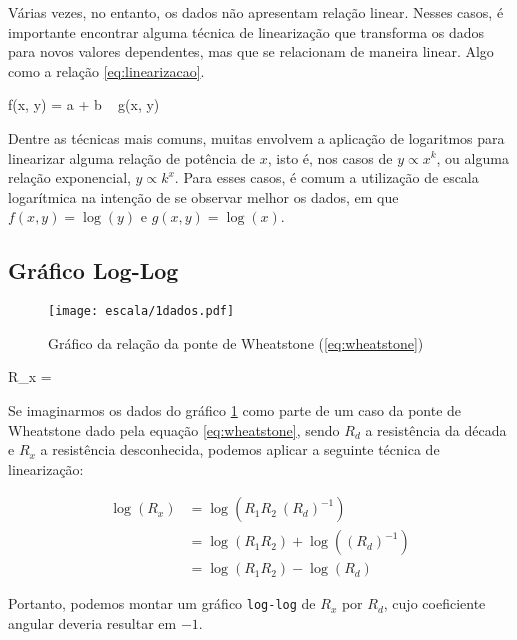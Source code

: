 Várias vezes, no entanto, os dados não apresentam relação linear. Nesses casos, é importante encontrar alguma técnica de linearização que transforma os dados para novos valores dependentes, mas que se relacionam de maneira linear. Algo como a relação \ref{eq:linearizacao}.

\begin{equacao} \label{eq:linearizacao}
    f(x, y) = a + b ~ g(x, y)
\end{equacao}

Dentre as técnicas mais comuns, muitas envolvem a aplicação de logaritmos para linearizar alguma relação de potência de $x$, isto é, nos casos de $y \propto x^k$, ou alguma relação exponencial, $y \propto k^x$. Para esses casos, é comum a utilização de escala logarítmica na intenção de se observar melhor os dados, em que $f(x, y) = \log(y)$ e $g(x, y) = \log(x)$.


\subsection{Gráfico Log-Log} \label{sec:escala:loglog}

    \begin{figure}[htbp]
        \centering
        \texttt{[image: escala/1dados.pdf]}

        \caption{Gráfico da relação da ponte de Wheatstone (\ref{eq:wheatstone})}
        \label{fig:escala:loglog:dados}
    \end{figure}

    \begin{equacao} \label{eq:wheatstone}
        R_x = 
    \end{equacao}

    Se imaginarmos os dados do gráfico \ref{fig:escala:loglog:dados} como parte de um caso da ponte de Wheatstone dado pela equação \ref{eq:wheatstone}, sendo $R_d$ a resistência da década e $R_x$ a resistência desconhecida, podemos aplicar a seguinte técnica de linearização:

    \begin{align*}
        \log(R_x)
            &= \log\left(R_1 R_2 ~ (R_d)^{-1}\right) \\
            &= \log(R_1 R_2) + \log\left((R_d)^{-1}\right) \\
            &= \log(R_1 R_2) - \log(R_d)
    \end{align*}

    Portanto, podemos montar um gráfico \texttt{log-log} de $R_x$ por $R_d$, cujo coeficiente angular deveria resultar em $-1$.


